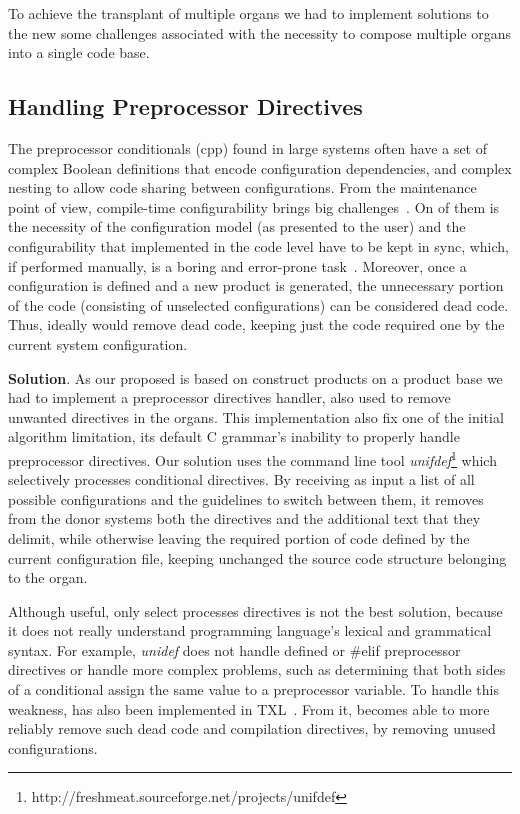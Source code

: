 To  achieve  the  transplant  of  multiple  organs we had to implement solutions to the new some challenges associated with the necessity to compose multiple organs into a single code base.

\subsection{Handling Preprocessor Directives}

The preprocessor conditionals (cpp) found in large systems often have a set of complex Boolean definitions that encode configuration dependencies, and complex nesting to allow code sharing between configurations. From the maintenance point of view, compile-time configurability brings big challenges~\cite{Tartler2011}. On of them is the necessity of the configuration model (as presented to the user) and the configurability that implemented in the code level have to be kept in sync, which, if performed manually, is a boring and error-prone task~\cite{Tartler2011}. Moreover, once a configuration is defined and a new product is generated, the unnecessary portion of the code (consisting of unselected configurations) can be considered dead code. Thus, ideally would remove dead code, keeping just the code required one by the current system configuration.

\textbf{Solution}. As our proposed is based on construct products on a product base we had to implement a preprocessor directives handler, also used to remove unwanted directives in the organs. This implementation also fix one of the initial algorithm limitation, its default C grammar’s inability to properly handle preprocessor directives. Our solution \autoscalpel uses the command line tool \emph{unifdef}\footnote{http://freshmeat.sourceforge.net/projects/unifdef}  which selectively processes conditional directives. By receiving as input a list of all possible configurations and the guidelines to switch between them, it removes from the donor systems both the directives and the additional text that they delimit, while otherwise leaving the required portion of code defined by the current configuration file, keeping unchanged the source code structure belonging to the organ. 
    
Although useful, only select processes directives is not the best solution, because it does not really understand programming language's lexical and grammatical syntax. For example, \emph{unidef} does not handle defined or \#elif preprocessor directives or handle more complex problems, such as determining that both sides of a conditional assign the same value to a preprocessor variable. To handle this weakness, \autoscalpel has also been implemented in TXL~\cite{Cordy2006}. From it, \autoscalpel becomes able to more reliably remove such dead code and compilation directives, by removing unused configurations.

